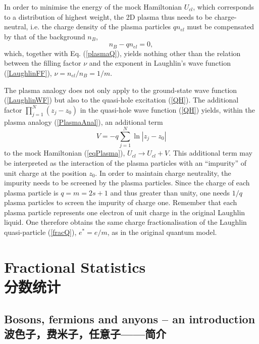 \documentclass[10pt]{book}
\newcommand{\beq}{\begin{equation}}
\newcommand{\eeq}{\end{equation}}
\begin{document}
In order to minimise the energy of the mock Hamiltonian $U_{cl}$, which corresponds to a distribution of highest weight, 
the 2D plasma thus needs to be charge-neutral, i.e. the charge density of the plasma particles $q n_{el}$ must be compensated
by that of the background $n_B$,
\beq\label{eqNeutrCharge}
n_B-qn_{el}=0,
\eeq
which, together with Eq. (\ref{plasmaQ}), yields nothing other than the relation between the filling factor $\nu$ and
the exponent in Laughlin's wave function (\ref{LaughlinFF}), $\nu=n_{el}/n_B=1/m$.

The plasma analogy does not only apply to the ground-state wave function (\ref{LaughlinWF}) but also to the quasi-hole excitation
(\ref{QH}). The additional factor $\prod_{j=1}^N(z_j - z_0)$ in the quasi-hole wave function (\ref{QH}) yields, within
the plasma analogy (\ref{PlasmaAnal}), an additional term 
\beq\label{PlasmaImp}
V=-q\sum_{j=1}^N \ln \left|z_j-z_0\right|
\eeq
to the mock Hamiltonian (\ref{eqPlasma}), $U_{cl}\to U_{cl}+V$. This additional term may be interpreted as the interaction
of the plasma particles with an ``impurity'' of unit charge at the position $z_0$. In order to maintain  charge 
neutrality, the impurity needs to be screened by the plasma particles. Since the charge of each plasma particle is 
$q=m=2s+1$ and thus greater than unity, one needs $1/q$ plasma particles to screen the impurity of charge one. 
Remember that each plasma particle represents one electron of unit charge in the original Laughlin liquid. One therefore obtains
the same charge fractionalisation of the Laughlin quasi-particle (\ref{fracQ}), $e^*=e/m$, as in the original quantum model. 






\section[分数统计]{Fractional Statistics\\\bf 分数统计}
\label{FQHE2}




\subsection[波色子，费米子，任意子——简介]{Bosons, fermions and anyons -- an introduction\\\bf 波色子，费米子，任意子——简介}
\end{document}
